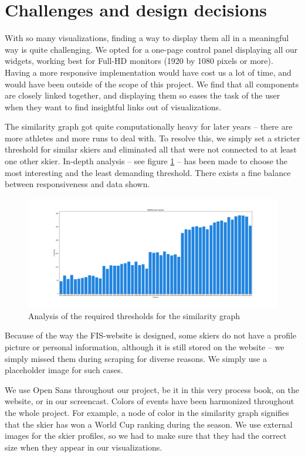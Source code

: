 \section{Challenges and design decisions}

With so many visualizations, finding a way to display them all in a meaningful way is quite challenging.
We opted for a one-page control panel displaying all our widgets, working best for Full-HD monitors (1920 by 1080 pixels or more).
Having a more responsive implementation would have cost us a lot of time, and would have been outside of the scope of this project.
We find that all components are closely linked together, and displaying them so eases the task of the user when they want to find insightful links out of visualizations.

The similarity graph got quite computationally heavy for later years -- there are more athletes and more runs to deal with.
To resolve this, we simply set a stricter threshold for similar skiers and eliminated all that were not connected to at least one other skier.
In-depth analysis -- see figure \ref{fig:threshold} -- has been made to choose the most interesting and the least demanding threshold.
There exists a fine balance between responsiveness and data shown.

\begin{figure}[ht]
    \centering
    \includegraphics[width=\linewidth]{img/threshold.png}
    \caption{Analysis of the required thresholds for the similarity graph}
    \label{fig:threshold}
\end{figure}

Because of the way the FIS-website is designed, some skiers do not have a profile picture or personal information, although it is still stored on the website -- we simply missed them during scraping for diverse reasons.
We simply use a placeholder image for such cases.

We use Open Sans throughout our project, be it in this very process book, on the website, or in our screencast.
Colors of events have been harmonized throughout the whole project.
For example, a node of color in the similarity graph signifies that the skier has won a World Cup ranking during the season.
We use external images for the skier profiles, so we had to make sure that they had the correct size when they appear in our visualizations.

